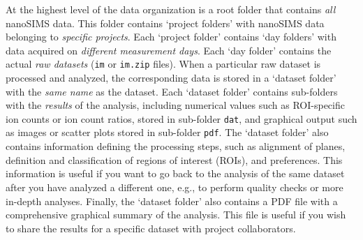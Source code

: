 \documentclass[a4paper, 11pt]{article}
\newcommand{\ttt}[1]{\texttt{#1}}
\newcounter{step}
\begin{document}
At the highest level of the data organization is a root folder that contains \emph{all} nanoSIMS data. This folder contains `project folders' with nanoSIMS data belonging to \emph{specific projects}. Each `project folder' contains `day folders' with data acquired on \emph{different measurement days}. Each `day folder' contains the actual \emph{raw datasets} (\ttt{im} or \ttt{im.zip} files). When a particular raw dataset is processed and analyzed, the corresponding data is stored in a `dataset folder' with the \emph{same name} as the dataset. Each `dataset folder' contains sub-folders with the \emph{results} of the analysis, including numerical values such as ROI-specific ion counts or ion count ratios, stored in sub-folder \ttt{dat}, and graphical output such as images or scatter plots stored in sub-folder \ttt{pdf}. The `dataset folder' also contains information defining the processing steps, such as alignment of planes, definition and classification of regions of interest (ROIs), and preferences. This information is useful if you want to go back to the analysis of the same dataset after you have analyzed a different one, e.g., to perform quality checks or more in-depth analyses. Finally, the `dataset folder' also contains a PDF file with a comprehensive graphical summary of the analysis. This file is useful if you wish to share the results for a specific dataset with project collaborators.
\end{document}
